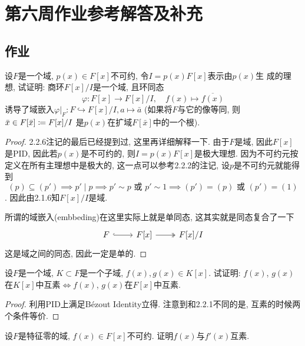 \documentclass{../solutions-cn}
\begin{document}
\section*{第六周作业参考解答及补充}

\subsection*{作业}

\begin{exercise}[习题2.3.2]
    设$F$是一个域, $p(x) \in F[x]$不可约, 令$I = p(x)F[x]$表示由$p(x)$生
成的理想, 试证明: 商环$F[x]/I$是一个域, 且环同态
\[
    \varphi:F[x] \to F[x]/I,\quad f(x) \mapsto \overline{f(x)}
\]
诱导了域嵌入$\varphi|_F: F\hookrightarrow F[x]/I, a \mapsto \bar{a}$
(如果将$F$与它的像等同, 则$\bar{x} \in F[\bar{x}] \mathrel{\coloneqq} F[x]/I$
是$p(x)$在扩域$F[\bar{x}]$中的一个根).
\end{exercise}

\begin{proof}
    2.2.6注记的最后已经提到过, 这里再详细解释一下. 由于$F$是域, 因此$F[x]$是PID, 因此若$p(x)$是不可约的, 则$I = p(x)F[x]$是极大理想. 因为不可约元按定义在所有主理想中是极大的, 这一点可以参考2.2.2的注记, 设$p$是不可约元就能得到
    \[
        (p) \subseteq (p') \implies p' \mid p \implies p' \sim p \text{ 或 } p' \sim 1 \implies (p') = (p) \text{ 或 } (p') = (1)
    \]. 因此由2.1.6知$F[x]/I$是域.
    
    所谓的域嵌入(embbeding)在这里实际上就是单同态, 这其实就是同态复合了一下
    \[
        \begin{tikzcd}
            F \arrow[r, hook] & {F[x]} \arrow[r, two heads] & {F[x]/I}
        \end{tikzcd}
    \]
    这是域之间的同态, 因此一定是单的.
\end{proof}

\begin{exercise}[习题2.3.3]
    设$F$是一个域, $K \subset F$是一个子域, $f(x), g(x) \in K[x]$.
试证明: $f(x)$, $g(x)$在$K[x]$中互素$\Leftrightarrow f(x)$,
$g(x)$在$F[x]$中互素.
\end{exercise}

\begin{proof}
    利用PID上满足Bézout Identity立得. 注意到和2.2.1不同的是, 互素的时候两个条件等价.
\end{proof}

\begin{exercise}[习题2.3.4]
    设$F$是特征零的域, $f(x) \in F[x]$不可约. 证明$f(x)$与$f'(x)$互素.
\end{exercise}
\end{document}
